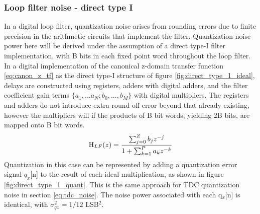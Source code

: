\subsubsection{Loop filter noise - direct type I}\label{lf_noise}
	In a digital loop filter, quantization noise arises from rounding errors due to finite precision in the arithmetic circuits that implement the filter. Quantization noise power here will be derived under the assumption of a direct type-I filter implementation, with B bits in each fixed point word throughout the loop filter. In a digital implementation of the canonical z-domain transfer function \ref{eq:canon_z_tf} as the direct type-I structure of figure \ref{fig:direct_type_1_ideal}, delays are constructed using registers, adders with digital adders, and the filter coefficient gain terms $\{a_1, ... a_N; b_0, ..., b_M\}$ with digital multipliers. The registers and adders do not introduce extra round-off error beyond that already existing, however the multipliers will if the products of B bit words, yielding 2B bits, are mapped onto B bit words. 
	\begin{equation}
		\textnormal{H}_{LF}(z) = \frac{\sum_{j=0}^Z b_jz^{-j}}{1+\sum_{k=1}^P a_kz^{-k}}\label{eq:canon_z_tf}
	\end{equation}
	\FloatBarrier
	Quantization in this case can be represented by adding a quantization error signal $q_x$[n] to the result of each ideal multiplication, as shown in figure \ref{fig:direct_type_1_quant}. This is the same approach for TDC quantization noise in section \ref{eq:tdc_noise}. The noise power associated with each q$_x$[n] is identical, with $\sigma_{qx}^2 = 1/12$ LSB$^2$. 

